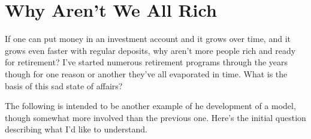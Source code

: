 \documentclass[]{memoir}
\begin{document}
\section{Why Aren't We All Rich}

If one can put money in an investment account and it grows over time,
and it grows even faster with regular deposits, why aren't more people
rich and ready for retirement? I've started numerous retirement programs
through the years though for one reason or another they've all
evaporated in time. What is the basis of this sad state of affairs?

The following is intended to be another example of he development of a
model, though somewhat more involved than the previous one. Here's the
initial question describing what I'd like to understand.

\FloatBarrier 
\end{document}
